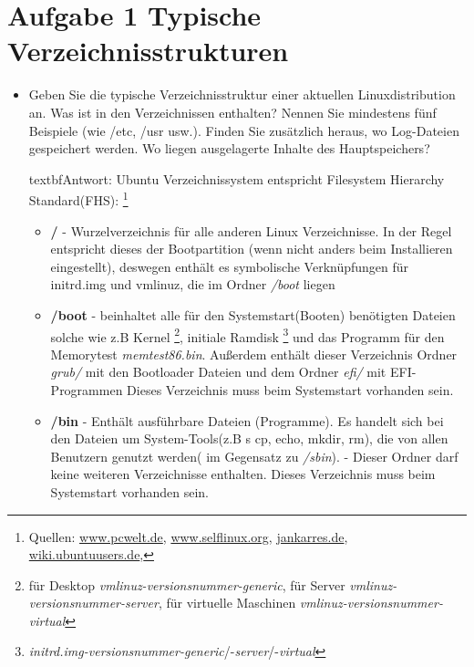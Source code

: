 \section{Aufgabe 1 Typische Verzeichnisstrukturen}
	\begin{itemize}
		\item Geben Sie die typische Verzeichnisstruktur einer aktuellen Linuxdistribution an. Was ist
		in den Verzeichnissen enthalten? Nennen Sie mindestens fünf Beispiele (wie /etc, /usr
		usw.). Finden Sie zusätzlich heraus, wo Log-Dateien gespeichert werden.
		Wo liegen ausgelagerte Inhalte des Hauptspeichers?

		textbf{Antwort}: Ubuntu Verzeichnissystem entspricht Filesystem Hierarchy Standard(FHS):
		\footnote{Quellen:
		\href{http://www.pcwelt.de/ratgeber/So_funktioniert_die_Linux-Ordnerstruktur-Everything_is_a_file-8772939.html}{www.pcwelt.de},
		\href{http://www.selflinux.org/selflinux/html/verzeichnisse_unter_linux01.html}{www.selflinux.org},
		\href{https://jankarres.de/2014/01/debian-linux-verzeichnisbaum-erklaert}{jankarres.de},
		\href{https://wiki.ubuntuusers.de/Verzeichnisstruktur}{wiki.ubuntuusers.de},
		}
		\begin{itemize}
			\item \textbf{/} - Wurzelverzeichnis für alle anderen Linux Verzeichnisse.
			 In der Regel entspricht dieses der Bootpartition (wenn nicht anders beim Installieren eingestellt),
			 deswegen enthält es symbolische Verknüpfungen für initrd.img und vmlinuz,
			 die im Ordner \textit{/boot} liegen
			 \item \textbf{/boot} - beinhaltet alle für den Systemstart(Booten) benötigten Dateien
			 solche wie z.B Kernel \footnote{
			 für Desktop \textit{vmlinuz-versionsnummer-generic},
			 für Server \textit{vmlinuz-versionsnummer-server},
			 für virtuelle Maschinen \textit{vmlinuz-versionsnummer-virtual}
			 }, initiale Ramdisk \footnote{
			 \textit{initrd.img-versionsnummer-generic}/-\textit{server}/-\textit{virtual}}
			 und das Programm für den Memorytest \textit{memtest86.bin}.
			 Außerdem enthält dieser Verzeichnis Ordner \textit{grub/} mit den Bootloader Dateien
			 und dem Ordner \textit{efi/} mit EFI-Programmen
			 Dieses Verzeichnis muss beim Systemstart vorhanden sein.
			\item \textbf{/bin} - Enthält ausführbare Dateien (Programme).
			Es handelt sich bei den Dateien um System-Tools(z.B s cp, echo, mkdir, rm), die von allen Benutzern
			genutzt werden( im Gegensatz zu \textit{/sbin}). - Dieser Ordner darf keine
			weiteren Verzeichnisse enthalten. Dieses Verzeichnis muss beim Systemstart vorhanden sein.

\end{itemize}
\end{itemize}
